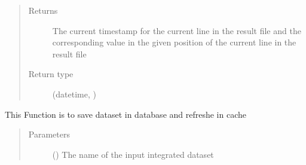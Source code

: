 \documentclass[letterpaper,10pt,english]{sphinxmanual}
\begin{document}
\begin{fulllineitems}
\begin{fulllineitems}
\begin{quote}
\begin{description}
\begin{itemize}
\end{itemize}

\item[{Returns}] \leavevmode
The current timestamp for the current line in the result file and the corresponding        value in the given position of the current line in the result file

\item[{Return type}] \leavevmode
(datetime, )

\end{description}\end{quote}

\end{fulllineitems}


\begin{fulllineitems}
\label{\detokenize{AgentTools.util:AgentTools.util.OutputUtil.OutputUtil.save_dataset}}
This Function is to save dataset in database and refreshe in cache
\begin{quote}\begin{description}
\item[{Parameters}] \leavevmode
{} () \textendash{} The name of the input integrated dataset

\end{description}\end{quote}

\end{fulllineitems}



\end{fulllineitems}
\end{document}
